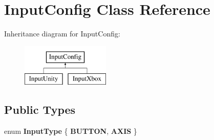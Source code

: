 \hypertarget{class_input_config}{\section{Input\-Config Class Reference}
\label{class_input_config}
}
Inheritance diagram for Input\-Config\-:\begin{figure}[H]
\begin{center}
\leavevmode
\includegraphics[height=2.000000cm]{class_input_config}
\end{center}
\end{figure}
\subsection*{Public Types}
\begin{DoxyCompactItemize}
\item 
enum {\bfseries Input\-Type} \{ {\bfseries B\-U\-T\-T\-O\-N}, 
{\bfseries A\-X\-I\-S}
 \}
\end{DoxyCompactItemize}
